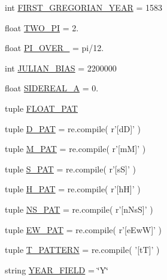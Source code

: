 \begin{DoxyCompactItemize}
\item 
int \hyperlink{namespaceamonpy_1_1sim_1_1sidereal_a0507d81c344a5ca1691e575909282b29}{F\-I\-R\-S\-T\-\_\-\-G\-R\-E\-G\-O\-R\-I\-A\-N\-\_\-\-Y\-E\-A\-R} = 1583
\item 
float \hyperlink{namespaceamonpy_1_1sim_1_1sidereal_a2c8d9a578f93121ccd945504ac583f03}{T\-W\-O\-\_\-\-P\-I} = 2.
\item 
float \hyperlink{namespaceamonpy_1_1sim_1_1sidereal_a6dc0322580f236f140468b48d70edc82}{P\-I\-\_\-\-O\-V\-E\-R\-\_} = pi/12.
\item 
int \hyperlink{namespaceamonpy_1_1sim_1_1sidereal_ac5d3d76ef51676c5080775d472d67a98}{J\-U\-L\-I\-A\-N\-\_\-\-B\-I\-A\-S} = 2200000
\item 
float \hyperlink{namespaceamonpy_1_1sim_1_1sidereal_a6ad7734e7b76fc336711a9a500bc8032}{S\-I\-D\-E\-R\-E\-A\-L\-\_\-\-A} = 0.
\item 
tuple \hyperlink{namespaceamonpy_1_1sim_1_1sidereal_ac016f678cf2cee161df382472e2d5949}{F\-L\-O\-A\-T\-\_\-\-P\-A\-T}
\item 
tuple \hyperlink{namespaceamonpy_1_1sim_1_1sidereal_ac5ea7c28fe60a3aee05aab43cf7077d0}{D\-\_\-\-P\-A\-T} = re.\-compile( r'\mbox{[}d\-D\mbox{]}' )
\item 
tuple \hyperlink{namespaceamonpy_1_1sim_1_1sidereal_a804824ee40100f10c0df7c2a78d7c557}{M\-\_\-\-P\-A\-T} = re.\-compile( r'\mbox{[}m\-M\mbox{]}' )
\item 
tuple \hyperlink{namespaceamonpy_1_1sim_1_1sidereal_a4b605d3e49744d64f74f57576d40f0de}{S\-\_\-\-P\-A\-T} = re.\-compile( r'\mbox{[}s\-S\mbox{]}' )
\item 
tuple \hyperlink{namespaceamonpy_1_1sim_1_1sidereal_a59cad1b2438b4770cff5fdc5c4b5b729}{H\-\_\-\-P\-A\-T} = re.\-compile( r'\mbox{[}h\-H\mbox{]}' )
\item 
tuple \hyperlink{namespaceamonpy_1_1sim_1_1sidereal_a0d12929ddde8e73c7a5caace56f4c6c5}{N\-S\-\_\-\-P\-A\-T} = re.\-compile( r'\mbox{[}n\-Ns\-S\mbox{]}' )
\item 
tuple \hyperlink{namespaceamonpy_1_1sim_1_1sidereal_ad7a8005369f4e3c771b42e5dadb008be}{E\-W\-\_\-\-P\-A\-T} = re.\-compile( r'\mbox{[}e\-Ew\-W\mbox{]}' )
\item 
tuple \hyperlink{namespaceamonpy_1_1sim_1_1sidereal_aeca578cc76ae401d8eaaaa9ce6c0ed47}{T\-\_\-\-P\-A\-T\-T\-E\-R\-N} = re.\-compile( '\mbox{[}t\-T\mbox{]}' )
\item 
string \hyperlink{namespaceamonpy_1_1sim_1_1sidereal_a066da938654a2cfd3ad8822f3b902391}{Y\-E\-A\-R\-\_\-\-F\-I\-E\-L\-D} = \char`\"{}Y\char`\"{}

\end{DoxyCompactItemize}
